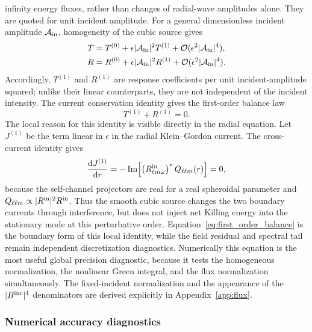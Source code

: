 \documentclass[aps,prd,twocolumn,10pt,nofootinbib,superscriptaddress,floatfix]{revtex4-2}
\newcommand{\dd}{\mathrm{d}}
\newcommand{\calO}{\mathcal{O}}
\newcommand{\Bin}{B^{\rm inc}}
\begin{document}
infinity energy fluxes, rather than changes of radial-wave amplitudes alone.
They are quoted for unit incident amplitude.  For a general dimensionless
incident amplitude ${\cal A}_{\rm in}$, homogeneity of the cubic source gives
\begin{align}
T={}&T^{(0)}+\epsilon|{\cal A}_{\rm in}|^2T^{(1)}
+\calO(\epsilon^2|{\cal A}_{\rm in}|^4),\nonumber\\
R={}&R^{(0)}+\epsilon|{\cal A}_{\rm in}|^2R^{(1)}
+\calO(\epsilon^2|{\cal A}_{\rm in}|^4).
\label{eq:amplitude_scaling}
\end{align}
Accordingly, $T^{(1)}$ and $R^{(1)}$ are response coefficients per unit
incident-amplitude squared; unlike their linear counterparts, they are not
independent of the incident intensity.
The current conservation identity gives the first-order balance law
\begin{equation}
T^{(1)}+R^{(1)}=0.
\label{eq:first_order_balance}
\end{equation}
The local reason for this identity is visible directly in the radial equation.
Let $J^{(1)}$ be the term linear in $\epsilon$ in the radial Klein--Gordon
current.  The cross-current identity gives
\begin{equation}
\frac{\dd J^{(1)}}{\dd r}
=-\operatorname{Im}\!\left[
\left(R^{\rm in}_{\ell m\omega}\right)^*Q_{\ell\ell m}(r)
\right]=0,
\label{eq:first_order_local_current}
\end{equation}
because the self-channel projectors are real for a real spheroidal parameter
and $Q_{\ell\ell m}\propto|R^{\rm in}|^2R^{\rm in}$.  Thus the smooth cubic
source changes the two boundary currents through interference, but does not
inject net Killing energy into the stationary mode at this perturbative order.
Equation~\eqref{eq:first_order_balance} is the boundary form of this local
identity, while the field residual and spectral tail remain independent
discretization diagnostics.
Numerically this equation is the most useful global precision diagnostic,
because it tests the homogeneous normalization, the nonlinear Green integral,
and the flux normalization simultaneously.  The fixed-incident normalization
and the appearance of the $|\Bin|^4$ denominators are derived explicitly in
Appendix~\ref{app:flux}.

\subsubsection{Numerical accuracy diagnostics}
\end{document}
